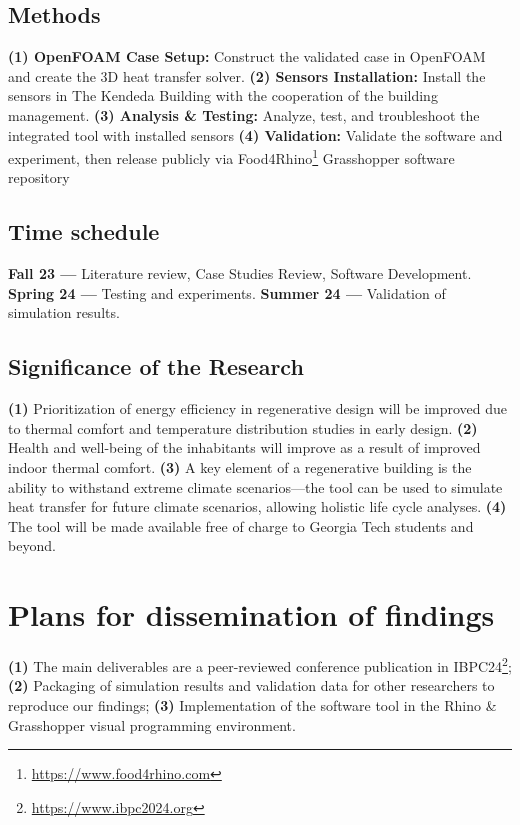 \documentclass[11pt, notitlepage]{article} %
\begin{document}
\subsection*{Methods}


  
\textbf{(1) OpenFOAM Case Setup:} Construct the validated case in OpenFOAM and create the 3D heat transfer solver. 
\textbf{(2) Sensors Installation:} Install the sensors in The Kendeda Building with the cooperation of the building management.
\textbf{(3) Analysis \& Testing:} Analyze, test, and troubleshoot the integrated tool with installed sensors
\textbf{(4) Validation:} Validate the software and experiment, then release publicly via Food4Rhino\footnote{\url{https://www.food4rhino.com}} Grasshopper software repository


\subsection*{Time schedule}
\textbf{Fall 23 --- } Literature review, Case Studies Review, Software Development.
\textbf{Spring 24 --- } Testing and experiments.
\textbf{Summer 24 --- } Validation of simulation results.


\subsection*{Significance of the Research}
\textbf{(1)} Prioritization of energy efficiency in regenerative design will be improved due to thermal comfort and temperature distribution studies in early design. 
\textbf{(2)} Health and well-being of the inhabitants will improve as a result of improved indoor thermal comfort.
\textbf{(3)} A key element of a regenerative building is the ability to withstand extreme climate scenarios---the tool can be used to simulate heat transfer for future climate scenarios, allowing holistic life cycle analyses.
\textbf{(4)} The tool will be made available free of charge to Georgia Tech students and beyond.


\section*{Plans for dissemination of findings}
\textbf{(1)} The main deliverables are a peer-reviewed conference publication in IBPC24\footnote{\url{https://www.ibpc2024.org}};
\textbf{(2)} Packaging of simulation results and validation data for other researchers to reproduce our findings;
\textbf{(3)} Implementation of the software tool in the Rhino \& Grasshopper visual programming environment.
\end{document}
